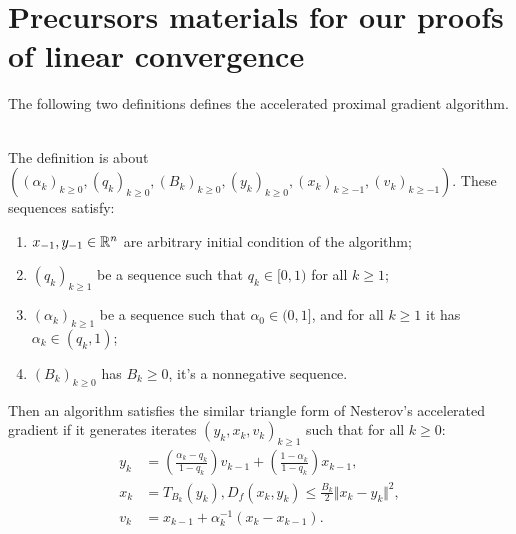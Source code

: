 \documentclass[12pt]{article}
\begin{document}
\section{Precursors materials for our proofs of linear convergence}
    The following two definitions defines the accelerated proximal gradient algorithm. 
    \begin{definition}\;\label{def:st-apg}\\
        The definition is about $((\alpha_k)_{k \ge 0}, (q_k)_{k \ge 0}, (B_k)_{k \ge 0}, (y_k)_{k \ge 0}, (x_k)_{k \ge -1}, (v_k)_{k \ge -1})$. 
        These sequences satisfy:
        \begin{enumerate}[nosep]
            \item $x_{-1}, y_{- 1}\in \mathbb R^n$ are arbitrary initial condition of the algorithm;
            \item $(q_k)_{k \ge 1}$ be a sequence such that $q_k \in [0, 1)$ for all $k \ge 1$;
            \item $(\alpha_k)_{k \ge 1}$ be a sequence such that $\alpha_0 \in (0, 1]$, and for all $k \ge 1$ it has $\alpha_k \in (q_k, 1)$;
            \item $(B_k)_{k \ge 0}$ has $B_k \ge 0$, it's a nonnegative sequence. 
        \end{enumerate}
        Then an algorithm satisfies the similar triangle form of Nesterov's accelerated gradient if it generates iterates $(y_k, x_k, v_k)_{k \ge 1}$ such that for all $k\ge 0$: 
        \begin{align*}
            y_k &= \left(\frac{\alpha_k - q_k}{1 - q_k}\right)v_{k - 1} 
            + \left(\frac{1 - \alpha_k}{1 - q_k}\right) x_{k - 1},
            \\
            x_k &= T_{B_k}(y_k), D_f(x_k, y_k) \le \frac{B_k}{2}\Vert x_k - y_k\Vert^2, 
            \\
            v_k &= x_{k - 1} + \alpha_k^{-1}(x_k - x_{k - 1}). 
        \end{align*}
    \end{definition}
\end{document}
